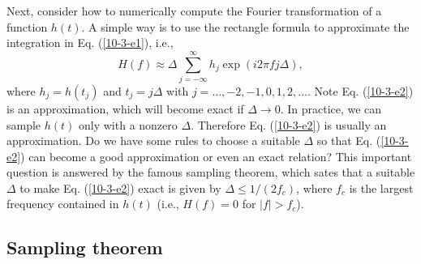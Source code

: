 \documentclass{article}
\begin{document}
Next, consider how to numerically compute the Fourier transformation of a
function $h (t)$. A simple way is to use the rectangle formula to approximate
the integration in Eq. (\ref{10-3-e1}), i.e.,
\begin{equation}
  \label{10-3-e2} H (f) \approx \Delta \sum_{j = - \infty}^{\infty} h_j \exp
  (i 2 \pi f j \Delta),
\end{equation}
where $h_j = h (t_j)$ and $t_j = j \Delta$ with $j = \ldots, - 2, - 1, 0, 1,
2, \ldots$. Note Eq. (\ref{10-3-e2}) is an approximation, which will become
exact if $\Delta \rightarrow 0$. In practice, we can sample $h (t)$ only with
a nonzero $\Delta$. Therefore Eq. (\ref{10-3-e2}) is usually an approximation.
Do we have some rules to choose a suitable $\Delta$ so that Eq.
(\ref{10-3-e2}) can become a good approximation or even an exact relation?
This important question is answered by the famous sampling theorem, which
sates that a suitable $\Delta$ to make Eq. (\ref{10-3-e2}) exact is given by
$\Delta \leqslant 1 / (2 f_c)$, where $f_c$ is the largest frequency contained
in $h (t)$ (i.e., $H (f) = 0$ for $|f| > f_c$).

\subsection{Sampling theorem}
\end{document}
